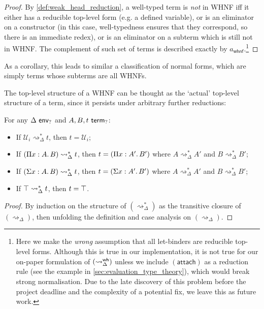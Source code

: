 \documentclass[twoside]{report}
\begin{document}
\begin{proof}
    By \cref{def:weak_head_reduction}, a well-typed term is \emph{not} in WHNF iff it either has a reducible top-level form (e.g. a defined variable), or is an eliminator on a constructor (in this case, well-typedness ensures that they correspond, so there is an immediate redex), or is an eliminator on a subterm which is still not in WHNF. The complement of such set of terms is described exactly by $a_\mathsf{whnf}$.\footnote{Here we make the \emph{wrong} assumption that all let-binders are reducible top-level forms. Although this is true in our implementation, it is not true for our on-paper formulation of $(\rightsquigarrow^{\mathsf{wh}}_\Delta)$ unless we include $(\mathsf{attach})$ as a reduction rule (see the example in \cref{sec:evaluation_type_theory}), which would break strong normalisation. Due to the late discovery of this problem before the project deadline and the complexity of a potential fix, we leave this as future work.}
\end{proof}

As a corollary, this leads to similar a classification of normal forms, which are simply terms whose subterms are all WHNFs.

The top-level structure of a WHNF can be thought as the `actual' top-level structure of a term, since it persists under arbitrary further reductions:

\begin{proposition}
    \label{thm:persistence_of_type_formers}
    For any $\Delta \ \mathsf{env}_{?}$ and $A, B, t \ \mathsf{term}_{?}$:
    \begin{itemize}[noitemsep]
        \item If $\mathcal U_i \rightsquigarrow_\Delta^\ast t$, then $t = \mathcal U_i$;
        \item If $(\Pi{x} : {A}.\,{B}) \rightsquigarrow_\Delta^\ast t$, then $t = (\Pi{x} : {A'}.\,{B'})$ where $A \rightsquigarrow_\Delta^\ast {A'}$ and $B \rightsquigarrow_\Delta^\ast {B'}$;
        \item If $(\Sigma{x} : {A}.\,{B}) \rightsquigarrow_\Delta^\ast t$, then $t = (\Sigma{x} : {A'}.\,{B'})$ where $A \rightsquigarrow_\Delta^\ast {A'}$ and $B \rightsquigarrow_\Delta^\ast {B'}$;
        \item If $\top \rightsquigarrow_\Delta^\ast t$, then $t = \top$.
    \end{itemize}
\end{proposition}

\begin{proof}
    By induction on the structure of $(\rightsquigarrow_\Delta^\ast)$ as the transitive closure of $(\rightsquigarrow_\Delta)$, then unfolding the definition and case analysis on $(\rightsquigarrow_\Delta)$.
\end{proof}
\end{document}
